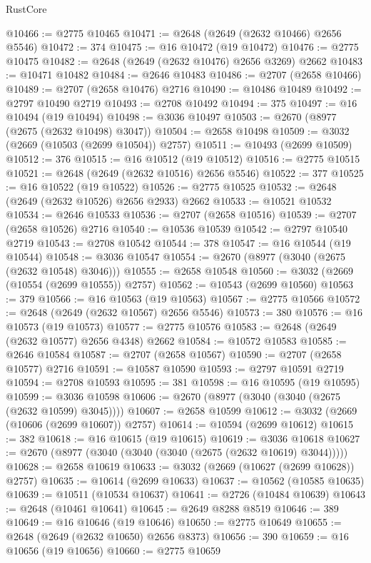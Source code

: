 \begin{lexlean}{RustCore}
\begin{coremodule}
@10466 := @2775 @10465
@10471 := @2648 (@2649 (@2632 @10466) @2656 @5546)
@10472 := 374
@10475 := @16 @10472 (@19 @10472)
@10476 := @2775 @10475
@10482 := @2648 (@2649 (@2632 @10476) @2656 @3269) @2662
@10483 := @10471 @10482
@10484 := @2646 @10483
@10486 := @2707 (@2658 @10466)
@10489 := @2707 (@2658 @10476) @2716
@10490 := @10486 @10489
@10492 := @2797 @10490 @2719
@10493 := @2708 @10492
@10494 := 375
@10497 := @16 @10494 (@19 @10494)
@10498 := @3036 @10497
@10503 := @2670 (@8977 (@2675 (@2632 @10498) @3047))
@10504 := @2658 @10498
@10509 := @3032 (@2669 (@10503 (@2699 @10504)) @2757)
@10511 := @10493 (@2699 @10509)
@10512 := 376
@10515 := @16 @10512 (@19 @10512)
@10516 := @2775 @10515
@10521 := @2648 (@2649 (@2632 @10516) @2656 @5546)
@10522 := 377
@10525 := @16 @10522 (@19 @10522)
@10526 := @2775 @10525
@10532 := @2648 (@2649 (@2632 @10526) @2656 @2933) @2662
@10533 := @10521 @10532
@10534 := @2646 @10533
@10536 := @2707 (@2658 @10516)
@10539 := @2707 (@2658 @10526) @2716
@10540 := @10536 @10539
@10542 := @2797 @10540 @2719
@10543 := @2708 @10542
@10544 := 378
@10547 := @16 @10544 (@19 @10544)
@10548 := @3036 @10547
@10554 := @2670 (@8977 (@3040 (@2675 (@2632 @10548) @3046)))
@10555 := @2658 @10548
@10560 := @3032 (@2669 (@10554 (@2699 @10555)) @2757)
@10562 := @10543 (@2699 @10560)
@10563 := 379
@10566 := @16 @10563 (@19 @10563)
@10567 := @2775 @10566
@10572 := @2648 (@2649 (@2632 @10567) @2656 @5546)
@10573 := 380
@10576 := @16 @10573 (@19 @10573)
@10577 := @2775 @10576
@10583 := @2648 (@2649 (@2632 @10577) @2656 @4348) @2662
@10584 := @10572 @10583
@10585 := @2646 @10584
@10587 := @2707 (@2658 @10567)
@10590 := @2707 (@2658 @10577) @2716
@10591 := @10587 @10590
@10593 := @2797 @10591 @2719
@10594 := @2708 @10593
@10595 := 381
@10598 := @16 @10595 (@19 @10595)
@10599 := @3036 @10598
@10606 := @2670 (@8977 (@3040 (@3040 (@2675 (@2632 @10599) @3045))))
@10607 := @2658 @10599
@10612 := @3032 (@2669 (@10606 (@2699 @10607)) @2757)
@10614 := @10594 (@2699 @10612)
@10615 := 382
@10618 := @16 @10615 (@19 @10615)
@10619 := @3036 @10618
@10627 := @2670 (@8977 (@3040 (@3040 (@3040 (@2675 (@2632 @10619) @3044)))))
@10628 := @2658 @10619
@10633 := @3032 (@2669 (@10627 (@2699 @10628)) @2757)
@10635 := @10614 (@2699 @10633)
@10637 := @10562 (@10585 @10635)
@10639 := @10511 (@10534 @10637)
@10641 := @2726 (@10484 @10639)
@10643 := @2648 (@10461 @10641)
@10645 := @2649 @8288 @8519
@10646 := 389
@10649 := @16 @10646 (@19 @10646)
@10650 := @2775 @10649
@10655 := @2648 (@2649 (@2632 @10650) @2656 @8373)
@10656 := 390
@10659 := @16 @10656 (@19 @10656)
@10660 := @2775 @10659

\end{coremodule}
\end{lexlean}

